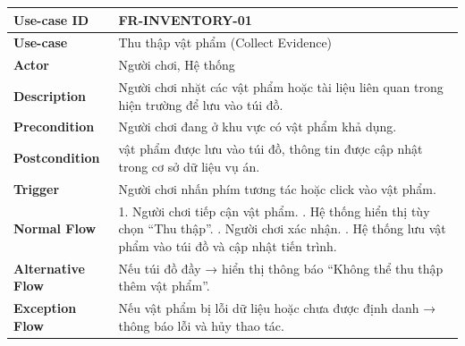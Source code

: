 \begin{table}[H]
\centering
\begin{tabular}{|p{4cm}|p{10cm}|}
\hline
\textbf{Use-case ID} & FR-INVENTORY-01 \\ \hline
\textbf{Use-case} & Thu thập vật phẩm (Collect Evidence) \\ \hline
\textbf{Actor} & Người chơi, Hệ thống \\ \hline
\textbf{Description} & Người chơi nhặt các vật phẩm hoặc tài liệu liên quan trong hiện trường để lưu vào túi đồ. \\ \hline
\textbf{Precondition} & Người chơi đang ở khu vực có vật phẩm khả dụng. \\ \hline
\textbf{Postcondition} & vật phẩm được lưu vào túi đồ, thông tin được cập nhật trong cơ sở dữ liệu vụ án. \\ \hline
\textbf{Trigger} & Người chơi nhấn phím tương tác hoặc click vào vật phẩm. \\ \hline
\textbf{Normal Flow} &
1. Người chơi tiếp cận vật phẩm. \newline
2. Hệ thống hiển thị tùy chọn “Thu thập”. \newline
3. Người chơi xác nhận. \newline
4. Hệ thống lưu vật phẩm vào túi đồ và cập nhật tiến trình. \\ \hline
\textbf{Alternative Flow} &
Nếu túi đồ đầy → hiển thị thông báo “Không thể thu thập thêm vật phẩm”. \\ \hline
\textbf{Exception Flow} &
Nếu vật phẩm bị lỗi dữ liệu hoặc chưa được định danh → thông báo lỗi và hủy thao tác. \\ \hline
\end{tabular}
\end{table}


